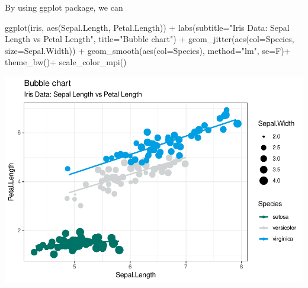 \documentclass[
]{article}
\newenvironment{Shaded}{\begin{snugshade}}{\end{snugshade}}
\newcommand{\AttributeTok}[1]{\textcolor[rgb]{0.77,0.63,0.00}{#1}}
\newcommand{\FunctionTok}[1]{\textcolor[rgb]{0.00,0.00,0.00}{#1}}
\newcommand{\NormalTok}[1]{#1}
\newcommand{\SpecialCharTok}[1]{\textcolor[rgb]{0.00,0.00,0.00}{#1}}
\newcommand{\StringTok}[1]{\textcolor[rgb]{0.31,0.60,0.02}{#1}}
\begin{document}
By using ggplot package, we can

\begin{Shaded}
\begin{Highlighting}[]
\FunctionTok{ggplot}\NormalTok{(iris, }\FunctionTok{aes}\NormalTok{(Sepal.Length, Petal.Length)) }\SpecialCharTok{+} 
  \FunctionTok{labs}\NormalTok{(}\AttributeTok{subtitle=}\StringTok{"Iris Data: Sepal Length vs Petal Length"}\NormalTok{,}
       \AttributeTok{title=}\StringTok{"Bubble chart"}\NormalTok{) }\SpecialCharTok{+} 
  \FunctionTok{geom\_jitter}\NormalTok{(}\FunctionTok{aes}\NormalTok{(}\AttributeTok{col=}\NormalTok{Species, }\AttributeTok{size=}\NormalTok{Sepal.Width)) }\SpecialCharTok{+} 
  \FunctionTok{geom\_smooth}\NormalTok{(}\FunctionTok{aes}\NormalTok{(}\AttributeTok{col=}\NormalTok{Species), }\AttributeTok{method=}\StringTok{"lm"}\NormalTok{, }\AttributeTok{se=}\NormalTok{F)}\SpecialCharTok{+}
  \FunctionTok{theme\_bw}\NormalTok{()}\SpecialCharTok{+}
  \FunctionTok{scale\_color\_mpi}\NormalTok{()}
\end{Highlighting}
\end{Shaded}

\begin{center}\includegraphics{figure/scatterPlot-1} \end{center}
\end{document}
